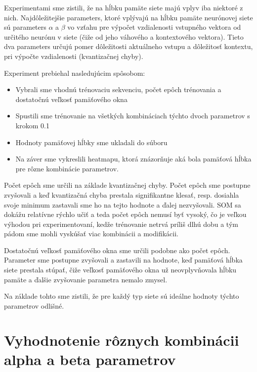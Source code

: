 


Experimentami sme zistili, že na hĺbku pamäte siete majú vplyv iba niektoré z nich. 
Najdôležitejšie parameters, ktoré vplývajú na hĺbku pamäte neurónovej siete sú parameters $\alpha$ a $\beta$
vo vzťahu pre výpočet vzdialenosti vstupného vektora od určitého neurónu v siete (čiže od jeho váhového a kontextového vektora).
Tieto dva parameters určujú pomer dôležitosti aktuálneho vstupu a dôležitosť kontextu, pri výpočte vzdialenosti (kvantizačnej chyby).

Experiment prebiehal nasledujúcim spôsobom:
\begin{itemize}
    \item Vybrali sme vhodnú trénovaciu sekvenciu, počet epôch trénovania a dostatočnú veľkosť pamäťového okna
    \item Spustili sme trénovanie na všetkých kombináciach týchto dvoch parametrov s krokom 0.1
    \item Hodnoty pamäťovej hĺbky sme ukladali do súboru
    \item Na záver sme vykreslili heatmapu, ktorá znázorňuje aká bola pamäťová hĺbka pre rôzne kombinácie parametrov.
\end{itemize}


Počet epôch sme určili na základe kvantizačnej chyby.
Počet epôch sme postupne zvyšovali a keď kvantizačná chyba prestala signifikantne klesať, resp. dosiahla 
svoje minimum zastavali sme ho na tejto hodnote a ďalej nezvyšovali. SOM sa dokážu relatívne rýchlo učiť a 
teda počet epôch nemusí byť vysoký, čo je veľkou výhodou pri experimentovaní, kedže trénovanie netrvá príliš dlhú dobu
a tým pádom sme mohli vyskúšať viac kombinácii a modifikácii.

Dostatočnú veľkosť pamäťového okna sme určili podobne ako počet epôch. Parameter sme postupne zvyšovali
a zastavili na hodnote, keď pamäťová hĺbka siete prestala stúpať, čiže veľkosť pamäťového okna už
neovplyvňovala hĺbku pamäte a ďalšie zvyšovanie parametra nemalo zmysel. 

Na základe tohto sme zistili, že pre každý typ siete sú ideálne hodnoty týchto parametrov odlišné.


\section{Vyhodnotenie rôznych kombinácii alpha a beta parametrov}

